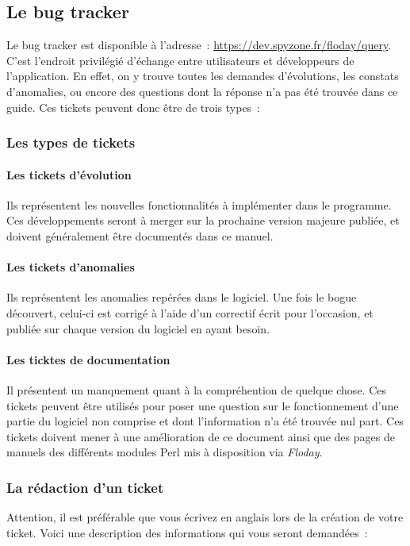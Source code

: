\subsection{Le bug tracker}
\label{sec:contribution_bt}

Le bug tracker est disponible à l'adresse~: \url{https://dev.spyzone.fr/floday/query}.
C'est l'endroit privilégié d'échange entre utilisateurs et développeurs de l'application.
En effet, on y trouve toutes les demandes d'évolutions, les constats d'anomalies, ou encore des questions dont la réponse n'a pas été trouvée dans ce guide.
Ces tickets peuvent donc être de trois types~:

\subsubsection{Les types de tickets}
\paragraph{Les tickets d'évolution} Ils représentent les nouvelles fonctionnalités à implémenter dans le programme. Ces développements seront à merger sur la prochaine version majeure publiée, et doivent généralement être documentés dans ce manuel.
\paragraph{Les tickets d'anomalies} Ils représentent les anomalies repérées dans le logiciel. Une fois le bogue découvert, celui-ci est corrigé à l'aide d'un correctif écrit pour l'occasion, et publiée sur chaque version du logiciel en ayant besoin.
\paragraph{Les ticktes de documentation} Il présentent un manquement quant à la compréhention de quelque chose. Ces tickets peuvent être utilisés pour poser une question sur le fonctionnement d'une partie du logiciel non comprise et dont l'information n'a été trouvée nul part.
Ces tickets doivent mener à une amélioration de ce document ainsi que des pages de manuels des différents modules Perl mis à disposition via \emph{Floday}.

\subsubsection{La rédaction d'un ticket}
Attention, il est préférable que vous écrivez en anglais lors de la création de votre ticket.
Voici une description des informations qui vous seront demandées~:
\newline

